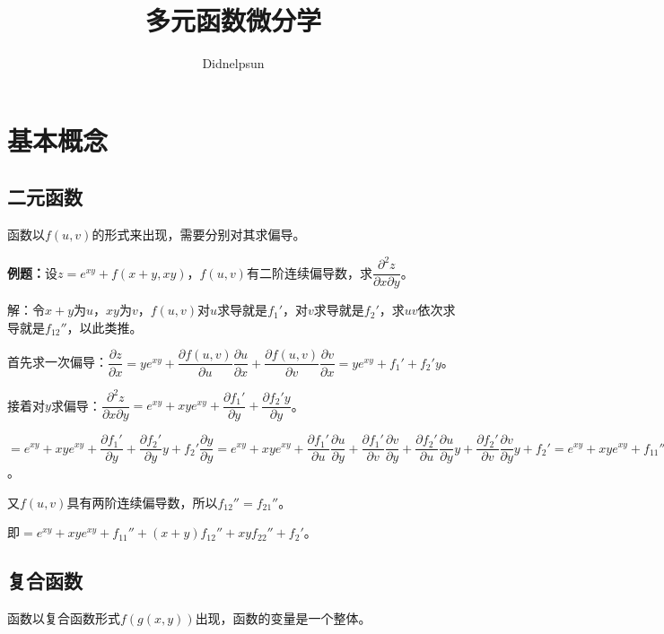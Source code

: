 \documentclass[UTF8, 12pt]{ctexart}
\author{Didnelpsun}
\title{多元函数微分学}
\date{}
\begin{document}
\maketitle
\pagestyle{empty}
\thispagestyle{empty}
\tableofcontents
\thispagestyle{empty}
\newpage
\pagestyle{plain}
\setcounter{page}{1}

\section{基本概念}

\subsection{二元函数}

函数以$f(u,v)$的形式来出现，需要分别对其求偏导。

\textbf{例题：}设$z=e^{xy}+f(x+y,xy)$，$f(u,v)$有二阶连续偏导数，求$\dfrac{\partial^2z}{\partial x\partial y}$。

解：令$x+y$为$u$，$xy$为$v$，$f(u,v)$对$u$求导就是$f_1'$，对$v$求导就是$f_2'$，求$uv$依次求导就是$f_{12}''$，以此类推。

首先求一次偏导：$\dfrac{\partial z}{\partial x}=ye^{xy}+\dfrac{\partial f(u,v)}{\partial u}\dfrac{\partial u}{\partial x}+\dfrac{\partial f(u,v)}{\partial v}\dfrac{\partial v}{\partial x}=ye^{xy}+f_1'+f_2'y$。

接着对$y$求偏导：$\dfrac{\partial^2z}{\partial x\partial y}=e^{xy}+xye^{xy}+\dfrac{\partial f_1'}{\partial y}+\dfrac{\partial f_2'y}{\partial y}$。

$=e^{xy}+xye^{xy}+\dfrac{\partial f_1'}{\partial y}+\dfrac{\partial f_2'}{\partial y}y+f_2'\dfrac{\partial y}{\partial y}=e^{xy}+xye^{xy}+\dfrac{\partial f_1'}{\partial u}\dfrac{\partial u}{\partial y}+\dfrac{\partial f_1'}{\partial v}\dfrac{\partial v}{\partial y}+\dfrac{\partial f_2'}{\partial u}\dfrac{\partial u}{\partial y}y+\dfrac{\partial f_2'}{\partial v}\dfrac{\partial v}{\partial y}y+f_2'=e^{xy}+xye^{xy}+f_{11}''+f_{12}''x+f_{21}''y+f_{22}''xy+f_2'$。\medskip

又$f(u,v)$具有两阶连续偏导数，所以$f_{12}''=f_{21}''$。

即$=e^{xy}+xye^{xy}+f_{11}''+(x+y)f_{12}''+xyf_{22}''+f_2'$。

\subsection{复合函数}

函数以复合函数形式$f(g(x,y))$出现，函数的变量是一个整体。
\end{document}
